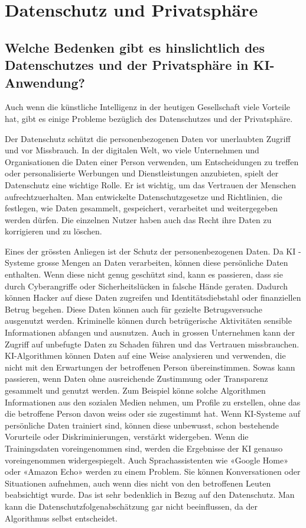 \documentclass{report}
\begin{document}
\chapter{Datenschutz und Privatsphäre}

\section{Welche Bedenken gibt es hinslichtlich des Datenschutzes und der Privatsphäre in KI-Anwendung?}

Auch wenn die künstliche Intelligenz in der heutigen Gesellschaft viele Vorteile hat, gibt es einige Probleme bezüglich des Datenschutzes und der Privatsphäre.

\vspace{2mm}Der Datenschutz schützt die personenbezogenen Daten vor unerlaubten Zugriff und vor Missbrauch. In der digitalen Welt, wo viele Unternehmen und Organisationen die Daten einer Person verwenden, um Entscheidungen zu treffen oder personalisierte Werbungen und Dienstleistungen anzubieten, spielt der Datenschutz eine wichtige Rolle. Er ist wichtig, um das Vertrauen der Menschen aufrechtzuerhalten. Man entwickelte Datenschutzgesetze und Richtlinien, die festlegen, wie Daten gesammelt, gespeichert, verarbeitet und weitergegeben werden dürfen. Die einzelnen Nutzer haben auch das Recht ihre Daten zu korrigieren und zu löschen.

\vspace{2mm}Eines der grössten Anliegen ist der Schutz der personenbezogenen Daten. Da KI -Systeme grosse Mengen an Daten verarbeiten, können diese persönliche Daten enthalten. Wenn diese nicht genug geschützt sind, kann es passieren, dass sie durch Cyberangriffe oder Sicherheitslücken in falsche Hände geraten. Dadurch können Hacker auf diese Daten zugreifen und Identitätsdiebstahl oder finanziellen Betrug begehen. Diese Daten können auch für gezielte Betrugsversuche ausgenutzt werden. Kriminelle können durch betrügerische Aktivitäten sensible Informationen abfangen und ausnutzen. Auch in grossen Unternehmen kann der Zugriff auf unbefugte Daten zu Schaden führen und das Vertrauen missbrauchen. KI-Algorithmen können Daten auf eine Weise analysieren und verwenden, die nicht mit den Erwartungen der betroffenen Person übereinstimmen. Sowas kann passieren, wenn Daten ohne ausreichende Zustimmung oder Transparenz gesammelt und genutzt werden. Zum Beispiel könne solche Algorithmen Informationen aus den sozialen Medien nehmen, um Profile zu erstellen, ohne das die betroffene Person davon weiss oder sie zugestimmt hat. Wenn KI-Systeme auf persönliche Daten trainiert sind, können diese unbewusst, schon bestehende Vorurteile oder Diskriminierungen, verstärkt widergeben. Wenn die Trainingsdaten voreingenommen sind, werden die Ergebnisse der KI genauso voreingenommen widergespiegelt. Auch Sprachassistenten wie «Google Home» oder «Amazon Echo» werden zu einem Problem. Sie können Konversationen oder Situationen aufnehmen, auch wenn dies nicht von den betroffenen Leuten beabsichtigt wurde. Das ist sehr bedenklich in Bezug auf den Datenschutz. Man kann die Datenschutzfolgenabschätzung gar nicht beeinflussen, da der Algorithmus selbst entscheidet.
\end{document}
